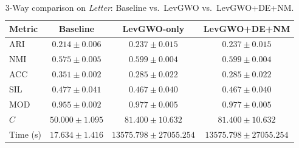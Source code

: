 \begin{table}[htbp]
\centering
\caption{3-Way comparison on \textit{Letter}: Baseline vs.\ LevGWO vs.\ LevGWO+DE+NM.}
\label{tab:letter_3way}
\begin{tabular}{lccc}
\toprule
Metric & Baseline & LevGWO-only & LevGWO+DE+NM \\
\midrule
ARI & $0.214 \pm 0.006$ & $\mathbf{0.237 \pm 0.015}$ & $\mathbf{0.237 \pm 0.015}$ \\
NMI & $0.575 \pm 0.005$ & $\mathbf{0.599 \pm 0.004}$ & $\mathbf{0.599 \pm 0.004}$ \\
ACC & $\mathbf{0.351 \pm 0.002}$ & $0.285 \pm 0.022$ & $0.285 \pm 0.022$ \\
SIL & $\mathbf{0.477 \pm 0.041}$ & $0.467 \pm 0.040$ & $0.467 \pm 0.040$ \\
MOD & $0.955 \pm 0.002$ & $\mathbf{0.977 \pm 0.005}$ & $\mathbf{0.977 \pm 0.005}$ \\
$C$ & $50.000 \pm 1.095$ & $81.400 \pm 10.632$ & $81.400 \pm 10.632$ \\
Time (s) & $17.634 \pm 1.416$ & $13575.798 \pm 27055.254$ & $13575.798 \pm 27055.254$ \\
\bottomrule
\end{tabular}
\end{table}